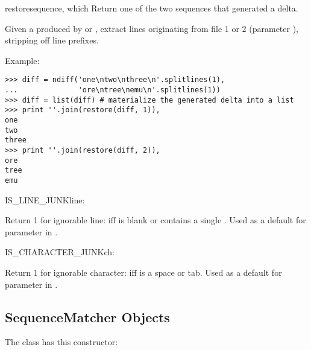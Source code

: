 \begin{funcdesc}{restore}{sequence, which}
  Return one of the two sequences that generated a delta.

  Given a  produced by  or
  , extract lines originating from file 1 or 2
  (parameter ), stripping off line prefixes.

  Example:

\begin{verbatim}
>>> diff = ndiff('one\ntwo\nthree\n'.splitlines(1),
...              'ore\ntree\nemu\n'.splitlines(1))
>>> diff = list(diff) # materialize the generated delta into a list
>>> print ''.join(restore(diff, 1)),
one
two
three
>>> print ''.join(restore(diff, 2)),
ore
tree
emu
\end{verbatim}

\end{funcdesc}


\begin{funcdesc}{IS_LINE_JUNK}{line}:

  Return 1 for ignorable line: iff  is blank or contains a
  single \character{\#}.  Used as a default for parameter
   in .

\end{funcdesc}


\begin{funcdesc}{IS_CHARACTER_JUNK}{ch}:

  Return 1 for ignorable character: iff  is a space or tab.
  Used as a default for parameter  in
  .

\end{funcdesc}


\begin{seealso}
\end{seealso}


\subsection{SequenceMatcher Objects \label{sequence-matcher}}

The  class has this constructor:

